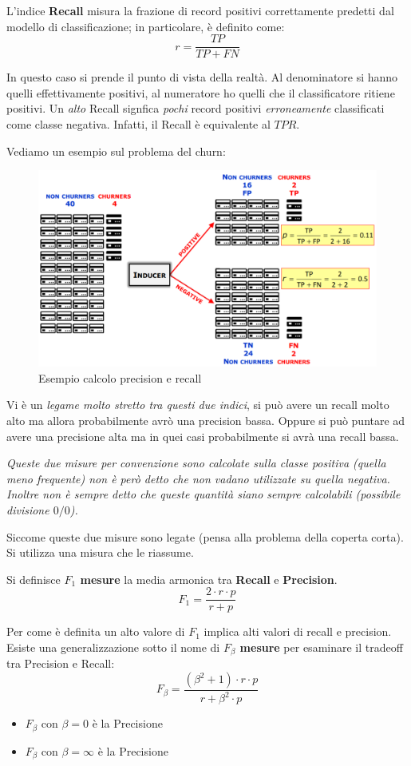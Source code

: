 \begin{defn}
	L'indice \textbf{Recall} misura la frazione di record positivi correttamente predetti dal modello di classificazione; in particolare, è definito come:
	\[r = \frac{TP}{TP+FN}\]
\end{defn}
In questo caso si prende il punto di vista della realtà. Al denominatore si hanno quelli effettivamente positivi, al numeratore ho quelli che il classificatore ritiene positivi. Un \textit{alto} Recall signfica \textit{pochi} record positivi \textit{erroneamente} classificati come classe negativa. Infatti, il Recall è equivalente al $TPR$.

Vediamo un esempio sul problema del churn:
\begin{figure}[H]
	\hspace{-0.2cm}
	\includegraphics[height=0.6 \linewidth]{classification/pict/esPrecisionRecall_merge.png}
	\caption{Esempio calcolo precision e recall}
\end{figure}
Vi è un \textit{legame molto stretto tra questi due indici}, si può avere un recall molto alto ma allora probabilmente avrò una precision bassa. Oppure si può puntare ad avere una precisione alta ma in quei casi probabilmente si avrà una recall bassa.

\textit{Queste due misure per convenzione sono calcolate sulla classe positiva (quella meno frequente) non \`e per\`o detto che non vadano utilizzate su quella negativa. Inoltre \textit{non} \`e sempre detto che queste quantit\`a siano sempre calcolabili (possibile divisione $0/0$).}

Siccome queste due misure sono legate (pensa alla problema della coperta corta). Si utilizza una misura che le riassume.
\begin{defn}
	Si definisce \textbf{$F_1$ mesure}  la media armonica tra \textbf{Recall} e \textbf{Precision}. 
	\[ F_1 = \frac{2 \cdot r \cdot p}{r + p}\]
\end{defn}	
Per come è definita un alto valore di $F_1$ implica alti valori di recall e precision.
Esiste una generalizzazione sotto il nome di \textbf{$F_\beta$ mesure} per esaminare il tradeoff tra Precision e Recall:
	\[ F_\beta = \frac{(\beta^2 + 1) \cdot r \cdot p}{r + \beta^2 \cdot p} \]
\begin{itemize}
	\item $F_\beta$ con $\beta = 0$ è la Precisione
	\item $F_\beta$ con $\beta = \infty$ è la Precisione	
\end{itemize}


